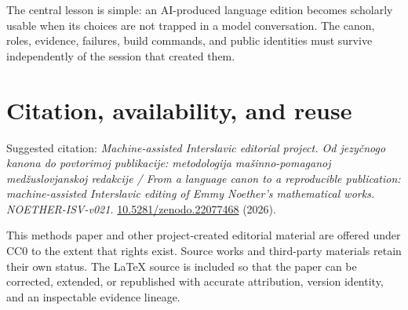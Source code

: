 \documentclass[11pt]{article}
\newcommand{\doiurl}[1]{\href{https://doi.org/#1}{#1}}
\begin{document}
The central lesson is simple: an AI-produced language edition becomes scholarly usable when its choices are not trapped in a model conversation. The canon, roles, evidence, failures, build commands, and public identities must survive independently of the session that created them.

\section*{Citation, availability, and reuse}

Suggested citation: \emph{Machine-assisted Interslavic editorial project. Od jezyčnogo kanona do povtorimoj publikacije: metodologija mašinno-pomaganoj medžuslovjanskoj redakcije / From a language canon to a reproducible publication: machine-assisted Interslavic editing of Emmy Noether's mathematical works. NOETHER-ISV-v021.} \doiurl{10.5281/zenodo.22077468} (2026).

This methods paper and other project-created editorial material are offered under CC0 to the extent that rights exist. Source works and third-party materials retain their own status. The LaTeX source is included so that the paper can be corrected, extended, or republished with accurate attribution, version identity, and an inspectable evidence lineage.
\end{document}
